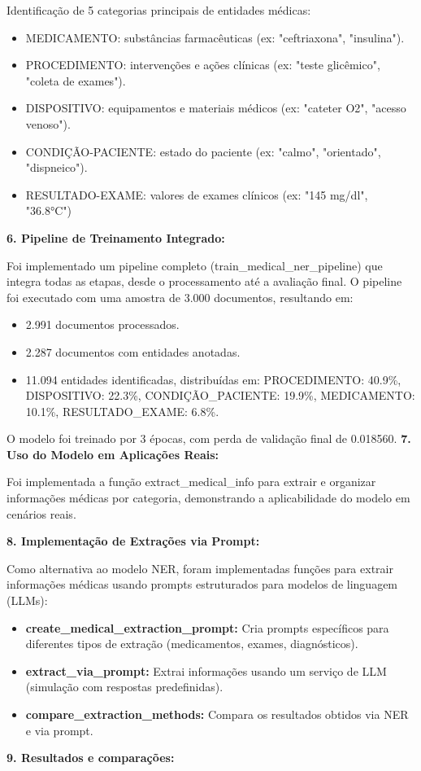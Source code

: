 \documentclass{article}
\begin{document}
\noindent Identificação de 5 categorias principais de entidades médicas: 
\begin{itemize}
    \item MEDICAMENTO: substâncias farmacêuticas (ex: "ceftriaxona", "insulina").
    \item PROCEDIMENTO: intervenções e ações clínicas (ex: "teste glicêmico", "coleta de exames").
    \item DISPOSITIVO: equipamentos e materiais médicos (ex: "cateter O2", "acesso venoso").
    \item CONDIÇÃO-PACIENTE: estado do paciente (ex: "calmo", "orientado", "dispneico").
    \item RESULTADO-EXAME: valores de exames clínicos (ex: "145 mg/dl", "36.8°C")
\end{itemize}
\textbf{6. Pipeline de Treinamento Integrado:}

\noindent Foi implementado um pipeline completo (train\_medical\_ner\_pipeline) que integra todas as etapas, desde o processamento até a avaliação final. O pipeline foi executado com uma amostra de 3.000 documentos, resultando em:
\begin{itemize}
    \item 2.991 documentos processados.
    \item 2.287 documentos com entidades anotadas.
    \item 11.094 entidades identificadas, distribuídas em: PROCEDIMENTO: 40.9\%, DISPOSITIVO: 22.3\%, CONDIÇÃO\_PACIENTE: 19.9\%, MEDICAMENTO: 10.1\%, RESULTADO\_EXAME: 6.8\%.
\end{itemize}
O modelo foi treinado por 3 épocas, com perda de validação final de 0.018560.
\textbf{7. Uso do Modelo em Aplicações Reais:} 

\noindent Foi implementada a função extract\_medical\_info para extrair e organizar informações médicas por categoria, demonstrando a aplicabilidade do modelo em cenários reais.

\noindent \textbf{8. Implementação de Extrações via Prompt:}

\noindent Como alternativa ao modelo NER, foram implementadas funções para extrair informações médicas usando prompts estruturados para modelos de linguagem (LLMs): 
\begin{itemize}
    \item \textbf{create\_medical\_extraction\_prompt:} Cria prompts específicos para diferentes tipos de extração (medicamentos, exames, diagnósticos).
    \item \textbf{extract\_via\_prompt:} Extrai informações usando um serviço de LLM (simulação com respostas predefinidas).
    \item \textbf{ compare\_extraction\_methods:} Compara os resultados obtidos via NER e via prompt.
\end{itemize}
\textbf{9. Resultados e comparações:}
\end{document}
